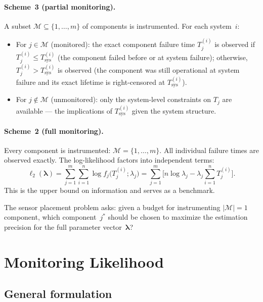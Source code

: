 \documentclass[12pt]{article}
\theoremstyle{definition}
\theoremstyle{remark}
\newcommand{\blam}{\boldsymbol{\lambda}}
\begin{document}
\paragraph{Scheme~3 (partial monitoring).}
A subset $\mathcal{M} \subseteq \{1, \ldots, m\}$ of components is
instrumented.  For each system~$i$:
\begin{itemize}
  \item For $j \in \mathcal{M}$ (monitored): the exact component
    failure time $T_j^{(i)}$ is observed if $T_j^{(i)} \leq T_{\mathrm{sys}}^{(i)}$
    (the component failed before or at system failure); otherwise,
    $T_j^{(i)} > T_{\mathrm{sys}}^{(i)}$ is observed (the component was still
    operational at system failure and its exact lifetime is
    right-censored at $T_{\mathrm{sys}}^{(i)}$).
  \item For $j \notin \mathcal{M}$ (unmonitored): only the system-level
    constraints on $T_j$ are available --- the implications of
    $T_{\mathrm{sys}}^{(i)}$ given the system structure.
\end{itemize}

\paragraph{Scheme~2 (full monitoring).}
Every component is instrumented: $\mathcal{M} = \{1, \ldots, m\}$.
All individual failure times are observed exactly.  The log-likelihood
factors into independent terms:
\begin{equation}\label{eq:loglik-complete}
  \ell_2(\blam) = \sum_{j=1}^{m} \sum_{i=1}^{n}
    \log f_j\bigl(T_j^{(i)}; \lambda_j\bigr)
  = \sum_{j=1}^{m} \bigl[n \log \lambda_j - \lambda_j \sum_{i=1}^{n} T_j^{(i)}\bigr].
\end{equation}
This is the upper bound on information and serves as a benchmark.

The sensor placement problem asks: given a budget for instrumenting
$|\mathcal{M}| = 1$ component, which component~$j^*$ should be chosen
to maximize the estimation precision for the full parameter
vector~$\blam$?


\section{Monitoring Likelihood}
\label{sec:likelihood}

\subsection{General formulation}
\label{sec:monitoring-loglik}
\end{document}
